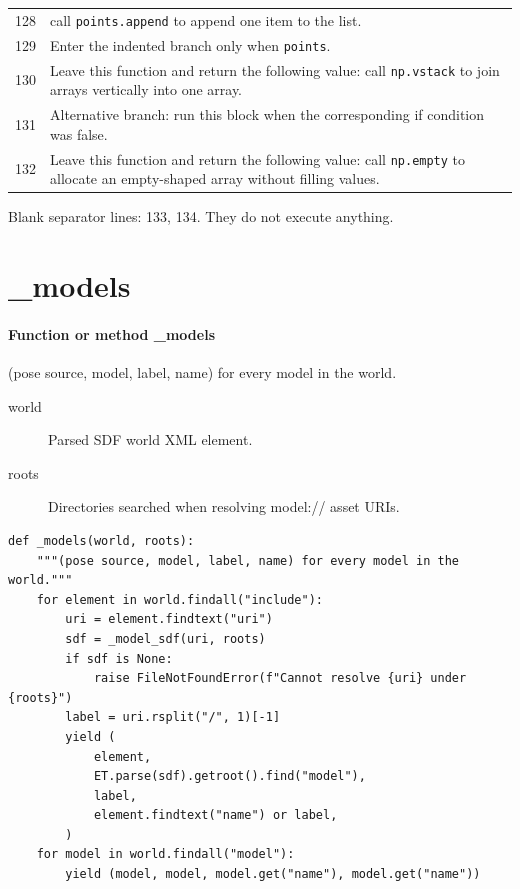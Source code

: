 \documentclass[11pt,a4paper]{book}
\begin{document}
\begin{longtable}{r p{}}
128 & call \texttt{points.append} to append one item to the list. \\

129 & Enter the indented branch only when \texttt{points}. \\

130 & Leave this function and return the following value: call \texttt{np.vstack} to join arrays vertically into one array. \\

131 & Alternative branch: run this block when the corresponding if condition was false. \\

132 & Leave this function and return the following value: call \texttt{np.empty} to allocate an empty-shaped array without filling values. \\

\end{longtable}

Blank separator lines: 133, 134. They do not execute anything.

\section{\_models}

\paragraph{Function or method \_models}
(pose source, model, label, name) for every model in the world.

\begin{description}
\item[world] Parsed SDF world XML element.
\item[roots] Directories searched when resolving model:// asset URIs.
\end{description}

\begin{lstlisting}[firstnumber=135]
def _models(world, roots):
    """(pose source, model, label, name) for every model in the world."""
    for element in world.findall("include"):
        uri = element.findtext("uri")
        sdf = _model_sdf(uri, roots)
        if sdf is None:
            raise FileNotFoundError(f"Cannot resolve {uri} under {roots}")
        label = uri.rsplit("/", 1)[-1]
        yield (
            element,
            ET.parse(sdf).getroot().find("model"),
            label,
            element.findtext("name") or label,
        )
    for model in world.findall("model"):
        yield (model, model, model.get("name"), model.get("name"))


\end{lstlisting}
\end{document}
